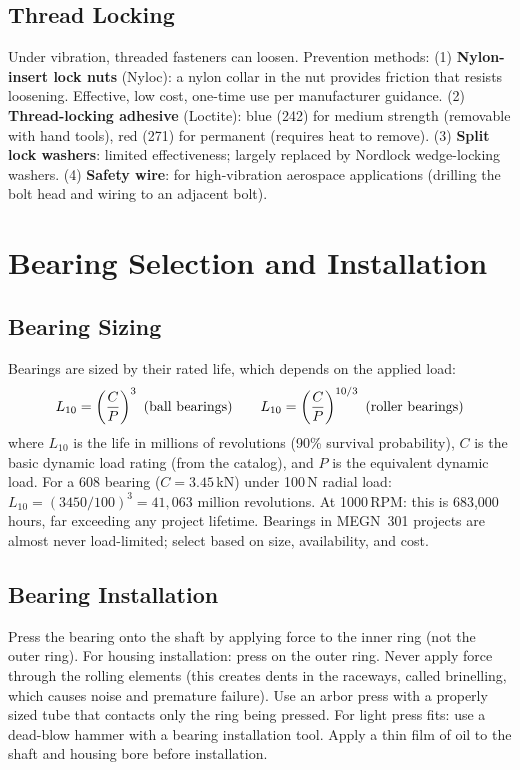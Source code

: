 \subsection{Thread Locking}
Under vibration, threaded fasteners can loosen. Prevention methods: (1) \textbf{Nylon-insert lock nuts} (Nyloc): a nylon collar in the nut provides friction that resists loosening. Effective, low cost, one-time use per manufacturer guidance. (2) \textbf{Thread-locking adhesive} (Loctite): blue (242) for medium strength (removable with hand tools), red (271) for permanent (requires heat to remove). (3) \textbf{Split lock washers}: limited effectiveness; largely replaced by Nordlock wedge-locking washers. (4) \textbf{Safety wire}: for high-vibration aerospace applications (drilling the bolt head and wiring to an adjacent bolt).

\section{Bearing Selection and Installation}
\subsection{Bearing Sizing}
Bearings are sized by their rated life, which depends on the applied load:
\begin{equation}
L_{10} = \left(\frac{C}{P}\right)^3 \text{ (ball bearings\index{ball bearing})} \qquad L_{10} = \left(\frac{C}{P}\right)^{10/3} \text{ (roller bearings\index{roller bearing})}
\end{equation}
where $L_{10}$ is the life in millions of revolutions (90\% survival probability), $C$ is the basic dynamic load rating (from the catalog), and $P$ is the equivalent dynamic load. For a 608 bearing ($C = 3.45$\,kN) under 100\,N radial load: $L_{10} = (3450/100)^3 = 41{,}063$ million revolutions. At 1000\,RPM: this is 683,000 hours, far exceeding any project lifetime. Bearings in MEGN~301 projects are almost never load-limited; select based on size, availability, and cost.

\subsection{Bearing Installation}
Press the bearing onto the shaft by applying force to the inner ring (not the outer ring). For housing installation: press on the outer ring. Never apply force through the rolling elements (this creates dents in the raceways, called brinelling, which causes noise and premature failure). Use an arbor press with a properly sized tube that contacts only the ring being pressed. For light press fits: use a dead-blow hammer with a bearing installation tool. Apply a thin film of oil to the shaft and housing bore before installation.

